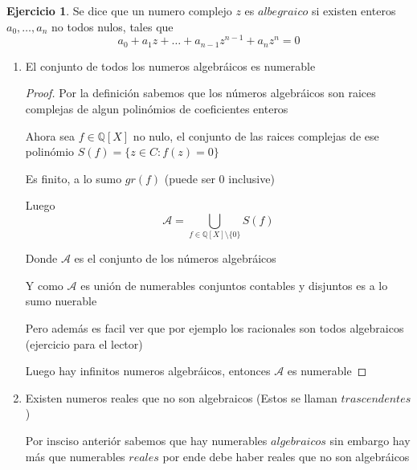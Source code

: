 \documentclass[12pt]{article}
\newcommand{\Q}{\mathbb{Q}}
\theoremstyle{definition}
\newtheorem{ej}{Ejercicio}
\begin{document}
\begin{ej}
Se dice que un numero complejo $z$ es $albegraico$ si existen enteros $a_{0}, \dots , a_{n}$ no todos nulos, tales que $$ a_{0} + a_{1}z + \dots + a_{n-1}z^{n-1} + a_{n}z^{n} = 0$$

\begin{enumerate}
  \item El conjunto de todos los numeros algebráicos es numerable

    \begin{proof}
       Por la definición sabemos que los números algebráicos son raices complejas de algun polinómios de coeficientes enteros 
       
     Ahora sea $f \in \Q[X]$ no nulo, el conjunto de las raices complejas de ese polinómio $S(f) = \{z \in C : f(z) = 0\}$

     Es finito, a lo sumo $gr(f)$ (puede ser 0 inclusive)

     Luego $$ \mathcal{A} = \bigcup_{f \in \Q[X] \setminus \{0\}} S(f)$$

     Donde $\mathcal{A}$ es el conjunto de los números algebráicos

     Y como $\mathcal{A}$ es unión de numerables conjuntos contables y disjuntos es a lo sumo nuerable

     Pero además es facil ver que por ejemplo los racionales son todos algebraicos (ejercicio para el lector) 

     Luego hay infinitos numeros algebráicos, entonces $\mathcal{A}$ es numerable

    \end{proof}

 
  \item Existen numeros reales que no son algebraicos (Estos se llaman $trascendentes$) 

 Por insciso anteriór sabemos que hay numerables $algebraicos$ sin embargo hay más que numerables $reales$ por ende debe haber reales que no son algebráicos
\end{enumerate}
\end{ej}
\end{document}
